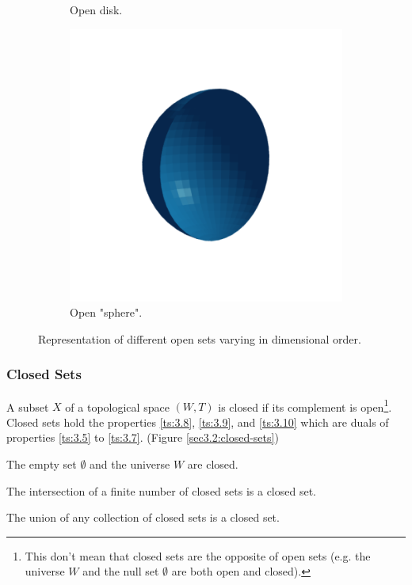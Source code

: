 \documentclass[a4paper,11pt,oneside]{article}
\begin{document}
\begin{figure}[ht]
\begin{subfigure}[b]{0.2\textwidth}
		\caption{Open disk.}
	\end{subfigure}
	\hfill
	\begin{subfigure}[b]{0.2\textwidth}
		\centering
		\includegraphics[width=\textwidth]{section3/3.2/open-sphere.png}
		\caption{Open "sphere".}
	\end{subfigure}
	\hfill
	\caption{Representation of different open sets varying in dimensional order.}
	\label{sec3.2:open-sets}
\end{figure}

   
    
\subsubsection{Closed Sets}
\begin{definition}
	A subset $X$ of a topological space $(W, T)$ is closed if its complement is open\footnote{This don't mean that closed sets are the opposite of open sets (e.g. the universe $W$ and the null set $\emptyset$ are both open and closed)\cite{mansfield_1987}.}. Closed sets hold the properties \eqref{ts:3.8}, \eqref{ts:3.9}, and \eqref{ts:3.10} which are duals of properties \eqref{ts:3.5} to \eqref{ts:3.7}. (Figure \ref{sec3.2:closed-sets})
				    
	\begin{property}
		\label{ts:3.8}
		The empty set $\emptyset$ and the universe $W$ are closed. \cite{mansfield_1987}
	\end{property}
	\begin{property}
		\label{ts:3.9}
		The intersection of a finite number of closed sets is a closed set. \cite{mansfield_1987}
	\end{property}
	\begin{property}
		\label{ts:3.10}
		The union of any collection of closed sets is a closed set. \cite{mansfield_1987}
	\end{property}
\end{definition}
    
\end{document}

